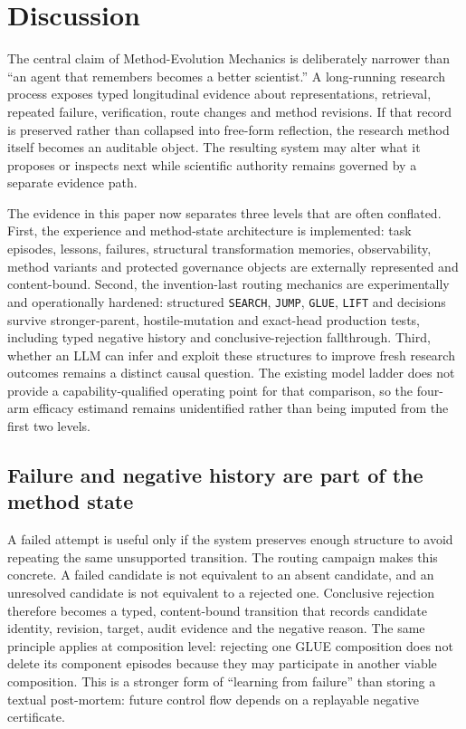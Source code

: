 \section{Discussion}

The central claim of Method-Evolution Mechanics is deliberately narrower than ``an agent that remembers becomes a better scientist.''  A long-running research process exposes typed longitudinal evidence about representations, retrieval, repeated failure, verification, route changes and method revisions.  If that record is preserved rather than collapsed into free-form reflection, the research method itself becomes an auditable object.  The resulting system may alter what it proposes or inspects next while scientific authority remains governed by a separate evidence path.

The evidence in this paper now separates three levels that are often conflated.  First, the experience and method-state architecture is implemented: task episodes, lessons, failures, structural transformation memories, observability, method variants and protected governance objects are externally represented and content-bound.  Second, the invention-last routing mechanics are experimentally and operationally hardened: structured \texttt{SEARCH}, \texttt{JUMP}, \texttt{GLUE}, \texttt{LIFT} and \CANNOTCHECK{} decisions survive stronger-parent, hostile-mutation and exact-head production tests, including typed negative history and conclusive-rejection fallthrough.  Third, whether an LLM can infer and exploit these structures to improve fresh research outcomes remains a distinct causal question.  The existing model ladder does not provide a capability-qualified operating point for that comparison, so the four-arm efficacy estimand remains unidentified rather than being imputed from the first two levels.

\subsection{Failure and negative history are part of the method state}

A failed attempt is useful only if the system preserves enough structure to avoid repeating the same unsupported transition.  The routing campaign makes this concrete.  A failed candidate is not equivalent to an absent candidate, and an unresolved candidate is not equivalent to a rejected one.  Conclusive rejection therefore becomes a typed, content-bound transition that records candidate identity, revision, target, audit evidence and the negative reason.  The same principle applies at composition level: rejecting one GLUE composition does not delete its component episodes because they may participate in another viable composition.  This is a stronger form of ``learning from failure'' than storing a textual post-mortem: future control flow depends on a replayable negative certificate.

